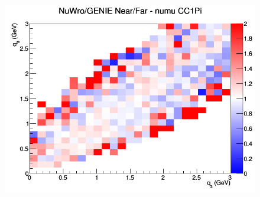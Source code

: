 \begin{figure}[h]
\endminipage
{}
\includegraphics[width=\linewidth]{eff_q0_q3/FGT/ratios/CC1Pi_NuWro_GENIE_numu_NF_q3_q0.png}
\endminipage
\newline
\end{figure}
\clearpage
